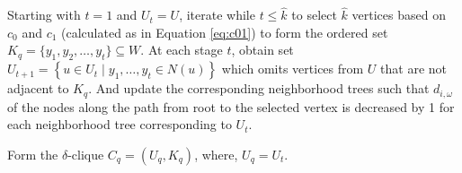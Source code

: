 \begin{algorithm}[!b]
{\begin{algorithmic}[1]
    

     \State \parbox[t]{\dimexpr\linewidth-\algorithmicindent}{
   Starting with $t=1$ and $U_t = U$, iterate  while $t \leq \hat{k}$ to select $\hat{k}$ vertices based on $c_0$ and $c_1$ (calculated as in Equation \ref{eq:c01}) to form the ordered set $K_{q} = \{ y_1, y_2, \ldots, y_{t} \}   \subseteq  W$. 
   At each stage $t$, obtain set $U_{t+1}=\left\{u \in U_t \mid y_1, \ldots, y_{t} \in N(u)\right\}$ which omits vertices from $U$ that are not adjacent to $K_{q}$. And update the corresponding neighborhood trees such that $d_{i,\omega}$ of the nodes along the path from root to the selected vertex is decreased by 1 for each neighborhood tree corresponding to $U_t$.
  }
   \State \parbox[t]{\dimexpr\linewidth-\algorithmicindent}{
   Form the $\delta$-clique $C_q = (U_q, K_q)$, where, $U_q  = U_{t}$.
   }
\EndWhile
{}
\end{algorithmic}
\label{alg:fm_org}
}
\end{algorithm}
